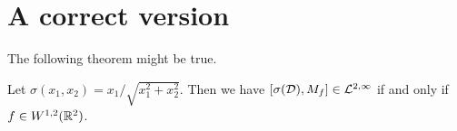 \documentclass{unswmaths}
\begin{document}
\section{A correct version}
The following theorem might be true. 
\begin{theorem}
    Let $\sigma(x_1,x_2) = x_1/\sqrt{x_1^2+x_2^2}$. 
    Then we have $[\sigma(\mathcal{D}),M_f] \in \mathcal{L}^{2,\infty}$
    if and only if $f \in W^{1,2}(\mathbb{R}^2)$. 
\end{theorem}


\label{Bibliography}



\end{document}
